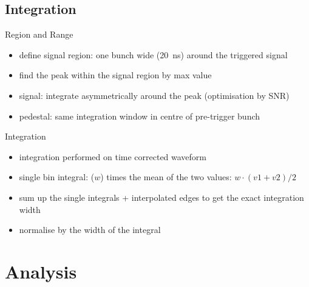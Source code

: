 \subsection{Integration}
\begin{frame}{Region and Range}

	
	
	\begin{itemize}\itemfill
		\item<2-> define signal region: one bunch wide (\SI{20}{\nano\second}) around the triggered signal
		\item<4-> find the peak within the signal region by max value
		\item<5-> signal: integrate asymmetrically around the peak (optimisation by SNR)
		\item<6-> pedestal: same integration window in centre of pre-trigger bunch
	\end{itemize}
\end{frame}
\begin{frame}{Integration}
	
	
	\begin{itemize}\itemfill
		\item integration performed on time corrected waveform 
		\item single bin integral: ($w$) times the mean of the two values: $w\cdot(v1 + v2) / 2$
		\item sum up the single integrals + interpolated edges to get the exact integration width
		\item normalise by the width of the integral
	\end{itemize}
 
\end{frame}\section{Analysis}

